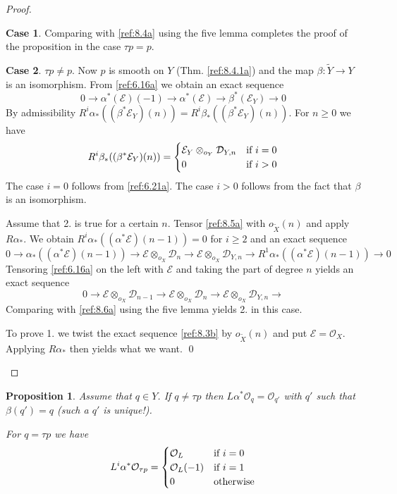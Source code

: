 \documentclass{amsproc}
\def\Dscr{{\mathcal D}}
\def\Escr{{\mathcal E}}
\def\Oscr{{\mathcal O}}
\def\r{\rightarrow}
\let\oldtext\text
\def\text#1{\oldtext{\upshape #1}}
\newtheorem{propositions}[lemmas]{Proposition}
\theoremstyle{definition}
\newtheorem{case}{Case}
\theoremstyle{remark}
\numberwithin{equation}{section}
\numberwithin{table}{section}
\numberwithin{figure}{section}
\begin{document}
\begin{proof}
\begin{case}
Comparing with \eqref{ref:8.4a} using the five lemma completes the
proof of the proposition in the case $\tau p=p$.
\end{case}
\begin{case}$\tau p\neq p$. Now
  $p$ is smooth on $Y$ (Thm. \ref{ref:8.4.1a}) and the map
  $\beta:\tilde{Y}\r Y$ is an isomorphism.  
    From \eqref{ref:6.16a} we obtain an
  exact sequence
\begin{equation}
\label{ref:8.5a}
0\r \alpha^\ast(\Escr)(-1)\r \alpha^\ast(\Escr) \r \beta^\ast(\Escr_Y)\r 0
\end{equation}
By admissibility $R^i\alpha_\ast
((\beta^\ast\Escr_Y)(n))= R^i\beta_\ast( (\beta^\ast\Escr_Y)(n))$. For
$n\ge 0$ we have
\[
R^i\beta_\ast((\beta^\ast\Escr_Y)(n))=
\begin{cases}
\Escr_Y\otimes_{o_Y} \Dscr_{Y,n}& \text{if $i=0$}\\
0&\text{if $i>0$}
\end{cases}
\]
The case $i=0$ follows from \eqref{ref:6.21a}. The
case $i>0$ follows from the fact that $\beta$ is an isomorphism.



Assume that 2. is true for a certain $n$. Tensor \eqref{ref:8.5a} with
$o_{\tilde X}(n)$ and apply $R\alpha_\ast$. We obtain $R^i\alpha_\ast
((\alpha^\ast\Escr)(n-1))=0$ for $i\ge 2$ and an exact sequence
\begin{equation}
\label{ref:8.6a}
0\r \alpha_\ast((\alpha^\ast\Escr)(n-1))
\r
\Escr\otimes_{o_X}\Dscr_n
\r
\Escr\otimes_{o_X}\Dscr_{Y,n}
\r
R^1\alpha_\ast((\alpha^\ast\Escr)(n-1))
\r
0\end{equation}
Tensoring \eqref{ref:6.16a} on the left with $\Escr$ and taking the part of
degree $n$ yields an exact sequence
\[
0\r \Escr\otimes_{o_X}\Dscr_{n-1}\r
\Escr\otimes_{o_X} \Dscr_n\r
\Escr\otimes_{o_X} \Dscr_{Y,n}\r
\]
Comparing with \eqref{ref:8.6a} using the five lemma yields 2.
in this case.

To prove 1. we twist the exact sequence \eqref{ref:8.3b} by
$o_{\tilde{X}}(n)$ and put $\Escr=\Oscr_X$. Applying $R\alpha_\ast$ then
yields what we want.
\qed\end{case} \def\qed{}
\end{proof}


\begin{propositions}
\label{ref:8.3.2a}
Assume that $q\in Y$. If $q\neq \tau p$ then $L\alpha^\ast
\Oscr_q=\Oscr_{q'}$ with $q'$ such that $\beta(q')=q$ (such a $q'$ is
unique!).

For $q=\tau p$  we have
\[
L^i \alpha^\ast \Oscr_{\tau p}
=
\begin{cases}
\Oscr_L &\text{if $i=0$}\\
\Oscr_L(-1)&\text{if $i=1$}\\
0&\text{otherwise}
\end{cases}
\]
\end{propositions}
\end{document}
